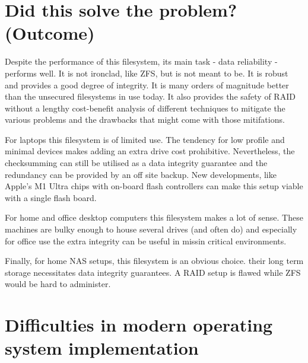 
    \section{Did this solve the problem? (Outcome)}

        Despite the performance of this filesystem, its main task - data
        reliability - performs well. It is not ironclad, like ZFS, but is not
        meant to be. It is robust and provides a good degree of integrity. It
        is many orders of magnitude better than the unsecured filesystems in
        use today. It also provides the safety of RAID without a lengthy
        cost-benefit analysis of different techniques to mitigate the various
        problems and the drawbacks that might come with those mitifations.

        For laptops this filesystem is of limited use. The tendency for low
        profile and minimal devices makes adding an extra drive cost
        prohibitive. Nevertheless, the checksumming can still be utilised as a
        data integrity guarantee and the redundancy can be provided by an off
        site backup. New developments, like Apple's M1 Ultra chips with
        on-board flash controllers
        \cite{https://www.notebookcheck.net/Mac-Studio-SSD-does-not-work-on-NVMe-top-level-ARM64-SSD-controller-in-M1-Ultra-makes-it-nearly-impossible-to-swap-out-or-add-raw-storage-modules.609363.0.html}
        can make this setup viable with a single flash board.

        For home and office desktop computers this filesystem makes a lot of
        sense. These machines are bulky enough to house several drives (and
        often do) and especially for office use the extra integrity can be
        useful in missin critical environments.

        Finally, for home NAS setups, this filesystem is an obvious choice.
        their long term storage necessitates data integrity guarantees. A RAID
        setup is flawed while ZFS would be hard to administer.


    \section{Difficulties in modern operating system implementation}


